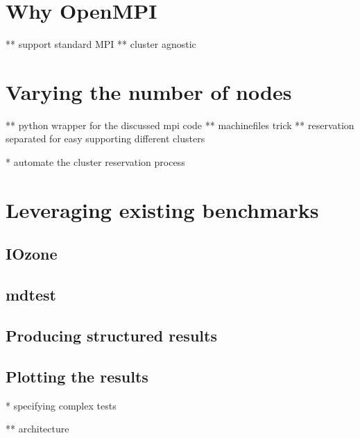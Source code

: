 


\section{Why OpenMPI}

** support standard MPI
** cluster agnostic


\section{Varying the number of nodes}

** python wrapper for the discussed mpi code
** machinefiles trick
** reservation separated for easy supporting different clusters

* automate the cluster reservation process


\section{Leveraging existing benchmarks}

\subsection{IOzone}


\subsection{mdtest}





\subsection{Producing structured results}



\subsection{Plotting the results}





* specifying complex tests

** architecture

